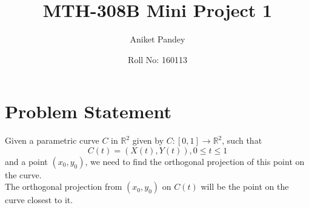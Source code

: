 \documentclass[12pt]{article}
\title{\vspace{-80pt}MTH-308B Mini Project 1}
\author{Aniket Pandey}
\date{Roll No: 160113}
\begin{document}
\maketitle

\section*{Problem Statement}
Given a parametric curve $C$ in $\mathbb{R}^2$ given by $C:[0, 1] \rightarrow \mathbb{R}^2$, such that
    \begin{equation}
        C(t) = (X(t), Y(t)), 0 \leq t \leq 1
    \end{equation}
and a point $(x_0,y_0)$, we need to find the orthogonal projection of this point on the curve. \\
The orthogonal projection from $(x_0,y_0)$ on $C(t)$ will be the point on the curve closest to it.
\end{document}

